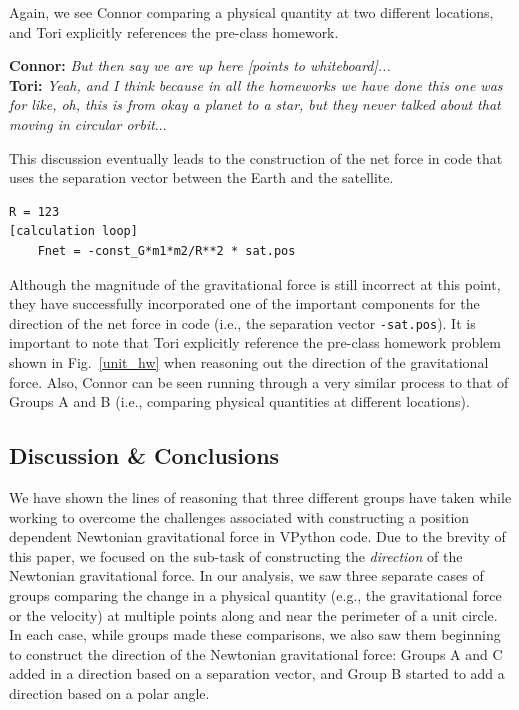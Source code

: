 \documentclass{msuphddissertation}
\begin{document}
\begin{doublespace}
Again, we see Connor comparing a physical quantity at two different locations, and Tori explicitly references the pre-class homework.

\vspace*{4pt}
\noindent\textbf{Connor:} {\it But then say we are up here [points to whiteboard]...}\\
\textbf{Tori:} {\it Yeah, and I think because in all the homeworks we have done this one was for like, oh, this is from okay a planet to a star, but they never talked about that moving in circular orbit}...
\vspace*{4pt}

This discussion eventually leads to the construction of the net force in code that uses the separation vector between the Earth and the satellite.  \begin{lstlisting}
R = 123
[calculation loop]
    Fnet = -const_G*m1*m2/R**2 * sat.pos
\end{lstlisting}

Although the magnitude of the gravitational force is still incorrect at this point, they have successfully incorporated one of the important components for the direction of the net force in code (i.e., the separation vector \texttt{-sat.pos}).  It is important to note that Tori explicitly reference the pre-class homework problem shown in Fig.~\ref{unit_hw} when reasoning out the direction of the gravitational force.  Also, Connor can be seen running through a very similar process to that of Groups A and B (i.e., comparing physical quantities at different locations).

\subsection{Discussion \& Conclusions}

We have shown the lines of reasoning that three different groups have taken while working to overcome the challenges associated with constructing a position dependent Newtonian gravitational force in VPython code.  Due to the brevity of this paper, we focused on the sub-task of constructing the \textit{direction} of the Newtonian gravitational force.  In our analysis, we saw three separate cases of groups comparing the change in a physical quantity (e.g., the gravitational force or the velocity) at multiple points along and near the perimeter of a unit circle.  In each case, while groups made these comparisons, we also saw them beginning to construct the direction of the Newtonian gravitational force: Groups A and C added in a direction based on a separation vector, and Group B started to add a direction based on a polar angle.


\end{doublespace}
\end{document}

